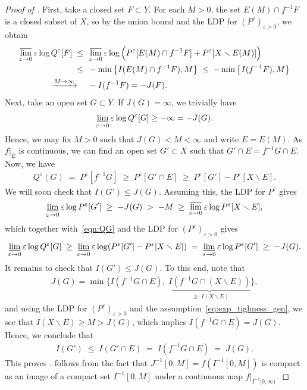\documentclass[a4paper, 11pt]{article}
\theoremstyle{definition}
\numberwithin{equation}{section}
\numberwithin{figure}{section}
\renewcommand{\liminf}{\varliminf}
\renewcommand{\limsup}{\varlimsup}
\begin{document}
\begin{proof}[Proof of ]
First, take a closed set $F \subset Y$. 
For each $M > 0$, the set $E(M) \cap f^{-1}F$ is a closed subset of $X$, 
so by the union bound and the LDP for $(P^\varepsilon)_{\varepsilon>0}$, we obtain
\begin{align*}
\limsup_{\varepsilon \to 0}\varepsilon\log Q^\varepsilon[F] 
\;\le\;\;& \limsup_{\varepsilon \to 0}\varepsilon\log \Big(P^\varepsilon[E(M) \cap f^{-1}F] + P^\varepsilon[X \smallsetminus E(M)]\Big)\\
\;\le\;\;& - \min \big\{I(E(M) \cap f^{-1}F) , M \big\}
\;\le\; - \min \big\{I(f^{-1}F) , M \big\} \\
\xrightarrow{M \to \infty} \quad \;& -I(f^{-1}F) = -J(F).
\end{align*}
Next, take an open set $G \subset Y$. If $J(G) = \infty$, we trivially have
\begin{align*}
\liminf_{\varepsilon \to 0}\varepsilon\log Q^\varepsilon[G] \ge -\infty = -J(G).
\end{align*}
Hence, we may fix $M > 0$ such that $J(G) < M < \infty$ and write $E = E(M)$.
As $f|_E$ is continuous, we can find an open set $G' \subset X$ such that $G' \cap E = f^{-1}G \cap E$. 
Now, we have
\begin{align}\label{eqn:QG}
Q^\varepsilon(G) \;=\;  P^\varepsilon[f^{-1}G] \; \ge\;  P^\varepsilon[G' \cap E] \; \ge\;  P^\varepsilon[G'] - P^\varepsilon[X \smallsetminus E].
\end{align}
We will soon check that $I(G') \le J(G)$. Assuming this, the LDP for $P^\varepsilon$ gives
\begin{align*}
\liminf_{\varepsilon \to 0}\varepsilon\log P^\varepsilon[G'] 
\;\ge\; -J(G) 
\;>\; -M 
\;\ge\; \limsup_{\varepsilon \to 0}\varepsilon\log P^\varepsilon[X \smallsetminus E],
\end{align*}
which together with~\eqref{eqn:QG} and the LDP for $(P^\varepsilon)_{\varepsilon > 0}$ gives
\begin{align*}
\liminf_{\varepsilon \to 0}\varepsilon\log Q^\varepsilon[G] 
\;\ge\; \liminf_{\varepsilon \to 0}\varepsilon\log(P^\varepsilon[G'] - P^\varepsilon[X \smallsetminus E]) 
\;=\; \liminf_{\varepsilon \to 0}\varepsilon\log P^\varepsilon[G'] 
\;\ge\; -J(G).
\end{align*}
It remains to check that $I(G') \le J(G)$. To this end, note that 
\begin{align*}
J(G) = \min \Big\{ I(f^{-1}G \cap E) , \; \underbrace{I(f^{-1}G \cap (X \smallsetminus E))}_{\;\ge\; I(X \smallsetminus E)} \Big\},
\end{align*} 
and using the LDP for $(P^\varepsilon)_{\varepsilon > 0}$ and the assumption~\eqref{eq:exp_tighness_gen},
we see that $I(X \smallsetminus E) \ge M > J(G)$, 
which implies $I(f^{-1}G \cap E) = J(G)$. Hence, we conclude that
\begin{align*}
I(G') \;\le\; I(G' \cap E) \;=\; I(f^{-1}G \cap E) \;=\; J(G).
\end{align*}
This proves .  follows from the fact that 
$J^{-1}[0,M] = f(I^{-1}[0,M])$ is compact as an image of a compact set $I^{-1}[0,M]$ under a continuous map $f|_{I^{-1}[0,\infty)}$. 
\end{proof}
\end{document}
